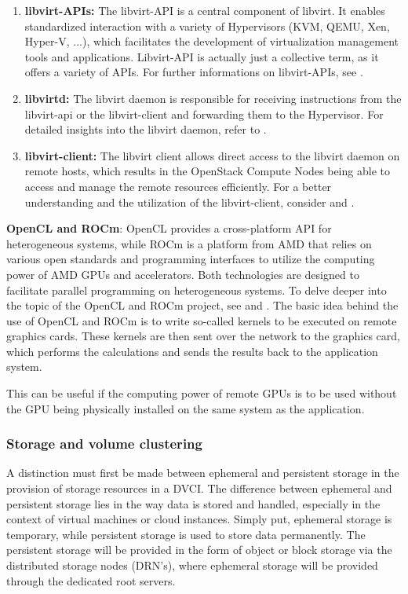 \documentclass[]{article}
\begin{document}
\begin{enumerate}[label=\textbullet]
	\item\textbf{libvirt-APIs:}
	The libvirt-API is a central component of libvirt. 
	It enables standardized interaction with a variety of Hypervisors (KVM, QEMU, Xen, Hyper-V, ...), which facilitates the development of virtualization management tools and applications. 
	Libvirt-API is actually just a collective term, as it offers a variety of APIs. 
	For further informations on libvirt-APIs, see \cite{libvirtDoc-api}.
	
	\item\textbf{libvirtd:}
	The libvirt daemon is responsible for receiving instructions from the libvirt-api or the libvirt-client and forwarding them to the Hypervisor. 
	For detailed insights into the libvirt daemon, refer to \cite{libvirtDoc-daemon}. 
	
	\item\textbf{libvirt-client:}
	The libvirt client allows direct access to the libvirt daemon on remote hosts, which results in the OpenStack Compute Nodes being able to access and manage the remote resources efficiently. 
	For a better understanding and the utilization of the libvirt-client, consider  \cite{libvirtDoc-remote-support} and \cite{libvirtDoc-connection-uri}.
\end{enumerate}

\textbf{OpenCL and ROCm}:
OpenCL provides a cross-platform API for heterogeneous systems, while ROCm is a platform from AMD that relies on various open standards and programming interfaces to utilize the computing power of AMD GPUs and accelerators. 
Both technologies are designed to facilitate parallel programming on heterogeneous systems.
To delve deeper into the topic of the OpenCL and ROCm project, see \cite{OpenCLDoc} and \cite{ROCmDoc}.
The basic idea behind the use of OpenCL and ROCm is to write so-called kernels to be executed on remote graphics cards.
These kernels are then sent over the network to the graphics card, which performs the calculations and sends the results back to the application system.

This can be useful if the computing power of remote GPUs is to be used without the GPU being physically installed on the same system as the application. 

\subsubsection{Storage and volume clustering}
A distinction must first be made between ephemeral and persistent storage in the provision of storage resources in a DVCI.
The difference between ephemeral and persistent storage lies in the way data is stored and handled, especially in the context of virtual machines or cloud instances. 
Simply put, ephemeral storage is temporary, while persistent storage is used to store data permanently.
The persistent storage will be provided in the form of object or block storage via the distributed storage nodes (DRN's), where ephemeral storage will be provided through the dedicated root servers. 
\end{document}
